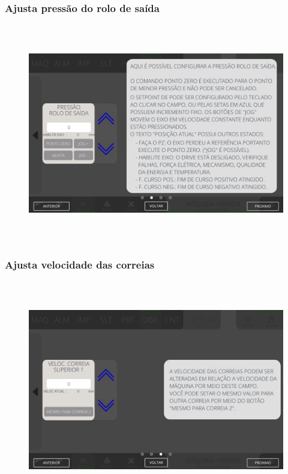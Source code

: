 \newpage
\thispagestyle{fancy}
\vspace*{40 pt}
\subsubsection{\small{Ajusta pressão do rolo de saída}}\label{miniTelaAjustesDobra2AjustaPressaoRoloSaida}
\vspace*{\fill}
\begin{figure}[h]
  \centering
  \includegraphics[width=576px,height=360px]{src/imagesMiniline/07-Folder/Settings/e2.png}
\end{figure}
\vspace*{\fill}

\newpage
\thispagestyle{fancy}
\vspace*{40 pt}
\subsubsection{\small{Ajusta velocidade das correias}}\label{miniTelaAjustesDobraVelocidadeCorreias}
\vspace*{\fill}
\begin{figure}[h]
  \centering
  \includegraphics[width=576px,height=360px]{src/imagesMiniline/07-Folder/Settings/e3.png}
\end{figure}
\vspace*{\fill}


